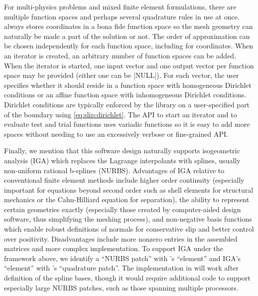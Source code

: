For multi-physics problems and mixed finite element formulations, there are multiple function spaces and perhaps several quadrature rules in use at once.
{\Dohp} always stores coordinates in a bona fide function space so the mesh geometry can naturally be made a part of the solution or not.
The order of approximation can be chosen independently for each function space, including for coordinates.
When an iterator is created, an arbitrary number of function spaces can be added.
When the iterator is started, one input vector and one output vector per function space may be provided (either one can be \cverb|NULL|).
For each vector, the user specifies whether it should reside in a function space with homogeneous Dirichlet conditions or an affine function space with inhomogeneous Dirichlet conditions.
Dirichlet conditions are typically enforced by the library on a user-specified part of the boundary using \eqref{eq:slip:dirichlet}.
The API to start an iterator and to evaluate test and trial functions uses variadic functions so it is easy to add more spaces without needing to use an excessively verbose or fine-grained API.

Finally, we mention that this software design naturally supports isogeometric analysis (IGA) \citep{cottrell2009isogeometric} which replaces the Lagrange interpolants with splines, usually non-uniform rational b-splines (NURBS).
Advantages of IGA relative to conventional finite element methods include higher order continuity (especially important for equations beyond second order such as shell elements for structural mechanics or the Cahn-Hilliard equation for separation), the ability to represent certain geometries exactly (especially those created by computer-aided design software, thus simplifying the meshing process), and non-negative basis functions which enable robust definitions of normals for conservative slip and better control over positivity.
Disadvantages include more nonzero entries in the assembled matrices and more complex implementation.
To support IGA under the framework above, we identify a ``NURBS patch'' with \Dohp's ``element'' and IGA's ``element'' with \Dohp's ``quadrature patch''.
The implementation in {\Dohp} will work after definition of the spline bases, though it would require additional code to support especially large NURBS patches, such as those spanning multiple processors.

